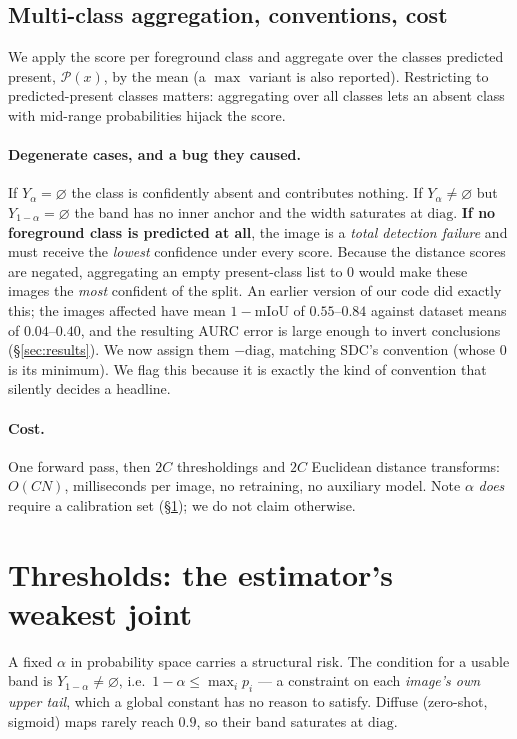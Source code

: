 \documentclass[11pt]{article}
\theoremstyle{remark}
\newcommand{\Ylo}{Y_{\alpha}}
\newcommand{\Yhi}{Y_{1-\alpha}}
\newcommand{\diag}{\mathrm{diag}}
\begin{document}
\subsection{Multi-class aggregation, conventions, cost}\label{sec:multiclass}

We apply the score per foreground class and aggregate over the classes predicted
present, $\mathcal{P}(x)$, by the mean (a $\max$ variant is also reported).
Restricting to predicted-present classes matters: aggregating over all classes lets
an absent class with mid-range probabilities hijack the score.

\paragraph{Degenerate cases, and a bug they caused.} If $\Ylo=\varnothing$ the class
is confidently absent and contributes nothing. If $\Ylo\ne\varnothing$ but
$\Yhi=\varnothing$ the band has no inner anchor and the width saturates at $\diag$.
\textbf{If no foreground class is predicted at all}, the image is a \emph{total
detection failure} and must receive the \emph{lowest} confidence under every score.
Because the distance scores are negated, aggregating an empty present-class list to
$0$ would make these images the \emph{most} confident of the split. An earlier
version of our code did exactly this; the images affected have mean $1-\mathrm{mIoU}$
of $0.55$--$0.84$ against dataset means of $0.04$--$0.40$, and the resulting AURC
error is large enough to invert conclusions (\S\ref{sec:results}). We now assign
them $-\diag$, matching SDC's convention (whose $0$ is its minimum). We flag this
because it is exactly the kind of convention that silently decides a headline.

\paragraph{Cost.} One forward pass, then $2C$ thresholdings and $2C$ Euclidean
distance transforms: $O(CN)$, milliseconds per image, no retraining, no auxiliary
model. Note $\alpha$ \emph{does} require a calibration set (\S\ref{sec:threshold});
we do not claim otherwise.

\section{Thresholds: the estimator's weakest joint}\label{sec:threshold}

A fixed $\alpha$ in probability space carries a structural risk. The condition for
a usable band is $\Yhi\ne\varnothing$, i.e.\ $1-\alpha \le \max_i p_i$ --- a
constraint on each \emph{image's own upper tail}, which a global constant has no
reason to satisfy. Diffuse (zero-shot, sigmoid) maps rarely reach $0.9$, so their
band saturates at $\diag$.
\end{document}
